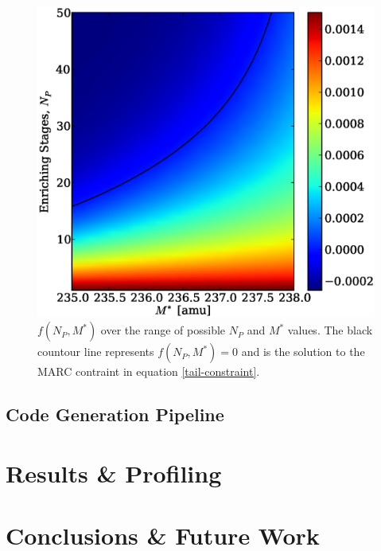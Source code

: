 \documentclass[preprint,12pt]{elsarticle}
\begin{document}
\begin{figure}[htpb]
\begin{center}
\includegraphics[scale=0.5]{np_constraint.eps}
\caption{$f(N_P, M^*)$ over the range of possible $N_P$ and $M^*$ values.  The black
countour line represents $f(N_P, M^*)=0$ and is the solution to the MARC contraint
in equation \ref{tail-constraint}.}
\label{np_contraint_fig}
\end{center}
\end{figure}


\subsection{Code Generation Pipeline}
\label{sec:codegen}

\section{Results \& Profiling}
\label{sec:res}

\section{Conclusions \& Future Work}
\label{sec:conc}


\end{document}
